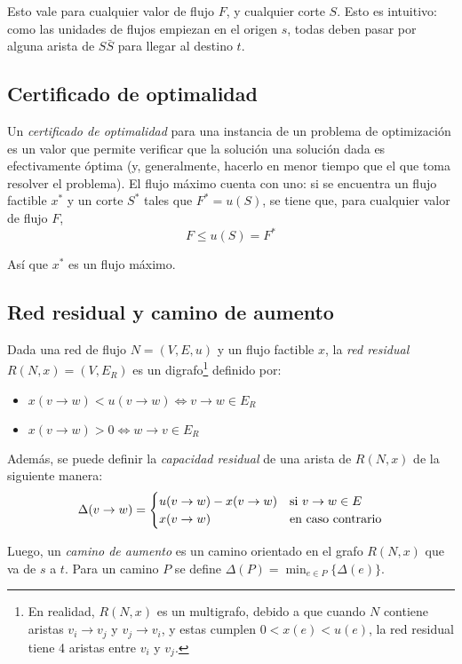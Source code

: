 Esto vale para cualquier valor de flujo $F$, y cualquier corte $S$. Esto es intuitivo: como las unidades de flujos empiezan en el origen $s$, todas deben pasar por alguna arista de $S\bar{S}$ para llegar al destino $t$.

\subsection{Certificado de optimalidad}
\label{flujo-certificado-optimalidad}

Un \textit{certificado de optimalidad} para una instancia de un problema de optimización es un valor que permite verificar que la solución una solución dada es efectivamente óptima (y, generalmente, hacerlo en menor tiempo que el que toma resolver el problema). El flujo máximo cuenta con uno: si se encuentra un flujo factible $x^*$ y un corte $S^*$ tales que $F^* = u(S)$, se tiene que, para cualquier valor de flujo $F$,
$$F \leq u(S) = F^*$$

Así que $x^*$ es un flujo máximo.

\subsection{Red residual y camino de aumento}

Dada una red de flujo $N = (V, E, u)$ y un flujo factible $x$, la \textit{red residual} $R(N, x) = (V, E_R)$ es un digrafo\footnote{En realidad, $R(N, x)$ es un multigrafo, debido a que cuando $N$ contiene aristas $v_i \rightarrow v_j$ y $v_j \rightarrow v_i$, y estas cumplen $0 < x(e) < u(e)$, la red residual tiene 4 aristas entre $v_i$ y $v_j$.} definido por:
\begin{itemize}
    \item $x(v \rightarrow w) < u(v \rightarrow w) \iff v \rightarrow w \in E_R$
    \item $x(v \rightarrow w) > 0 \iff w \rightarrow v \in E_R$
\end{itemize}

Además, se puede definir la \textit{capacidad residual} de una arista de $R(N, x)$ de la siguiente manera:
$$
    \Delta(v \rightarrow w) =
    \begin{cases}
        u(v \rightarrow w) - x(v \rightarrow w) & \text{si } v \rightarrow w \in E \\
        x(v \rightarrow w)                      & \text{en caso contrario}
    \end{cases}
$$

Luego, un \textit{camino de aumento} es un camino orientado en el grafo $R(N, x)$ que va de $s$ a $t$. Para un camino $P$ se define $\Delta(P) = \min_{e \in P}{\{\Delta(e)\}}$.

